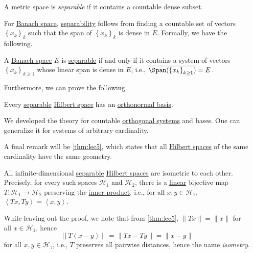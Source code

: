 \begin{definition}[Separable]\label{def:separable}
	A metric space is \emph{separable} if it contains a countable dense subset.
\end{definition}

For \hyperref[def:Banach-space]{Banach space}, \hyperref[def:separable]{separability} follows from finding a countable set of vectors \(\left\{ x_{k}\right\}_k\) such that the span of \(\left\{ x_{k}\right\}_k\) is dense in \(E\). Formally, we have the following.

\begin{lemma}\label{lma:separable-spaces}
	A \hyperref[def:Banach-space]{Banach space} \(E\) is \hyperref[def:separable]{separable} if and only if it contains a system of vectors \(\left\{ x_k \right\} _{k\geq 1}\) whose linear span is dense in \(E\), i.e., \(\overline{\Span(\left\{ x_k \right\} _{k\geq 1})} = E\).
\end{lemma}

Furthermore, we can prove the following.

\begin{theorem}
	Every \hyperref[def:separable]{separable} \hyperref[def:Hilbert-space]{Hilbert space} has an \hyperref[def:orthonormal-basis]{orthonormal basis}.
\end{theorem}

\begin{remark}
	We developed the theory for countable \hyperref[def:orthogonal-system]{orthogonal systems} and bases. One can generalize it for systems of arbitrary cardinality.
\end{remark}

A final remark will be \autoref{thm:lec5}, which states that all \hyperref[def:Hilbert-space]{Hilbert spaces} of the same cardinality have the same geometry.

\begin{theorem}\label{thm:lec5}
	All infinite-dimensional \hyperref[def:separable]{separable} \hyperref[def:Hilbert-space]{Hilbert spaces} are isometric to each other. Precisely, for every such spaces \(\mathcal{H} _1\) and \(\mathcal{H} _2\), there is a \hyperref[def:linear-op]{linear} bijective map \(T\colon \mathcal{H} _1 \to \mathcal{H} _2\) preserving the \hyperref[def:inner-product]{inner product}, i.e., for all \(x, y\in \mathcal{H} _1\), \(\left\langle Tx, Ty \right\rangle = \left\langle x, y \right\rangle\).
\end{theorem}

While leaving out the proof, we note that from \autoref{thm:lec5}, \(\lVert Tx \rVert = \lVert x \rVert \) for all \(x\in \mathcal{H} _1\), hence
\[
	\lVert T(x-y) \rVert
	= \lVert Tx - Ty \rVert
	= \lVert x - y \rVert
\]
for all \(x, y\in \mathcal{H} _1\), i.e., \(T\) preserves all pairwise distances, hence the name \emph{isometry}.


